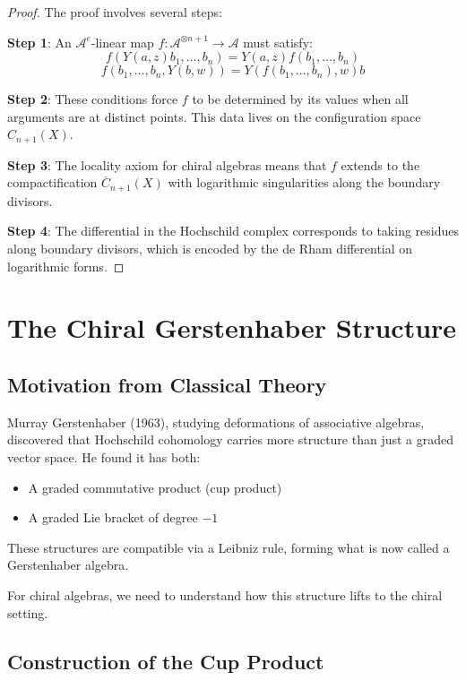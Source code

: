 \begin{proof}
The proof involves several steps:

\textbf{Step 1}: An $\mathcal{A}^e$-linear map $f: \mathcal{A}^{\otimes n+1} \to \mathcal{A}$ must satisfy:
\[
f(Y(a, z)b_1, \ldots, b_n) = Y(a, z)f(b_1, \ldots, b_n)
\]
\[
f(b_1, \ldots, b_n, Y(b, w)) = Y(f(b_1, \ldots, b_n), w)b
\]

\textbf{Step 2}: These conditions force $f$ to be determined by its values when all arguments are at distinct points. This data lives on the configuration space $C_{n+1}(X)$.

\textbf{Step 3}: The locality axiom for chiral algebras means that $f$ extends to the compactification $\overline{C}_{n+1}(X)$ with logarithmic singularities along the boundary divisors.

\textbf{Step 4}: The differential in the Hochschild complex corresponds to taking residues along boundary divisors, which is encoded by the de Rham differential on logarithmic forms. \qedhere
\end{proof}


\section{The Chiral Gerstenhaber Structure}

\subsection{Motivation from Classical Theory}

Murray Gerstenhaber (1963), studying deformations of associative algebras, discovered that Hochschild cohomology carries more structure than just a graded vector space. He found it has both:
\begin{itemize}
\item A graded commutative product (cup product)
\item A graded Lie bracket of degree $-1$
\end{itemize}
These structures are compatible via a Leibniz rule, forming what is now called a Gerstenhaber algebra.

For chiral algebras, we need to understand how this structure lifts to the chiral setting.

\subsection{Construction of the Cup Product}

